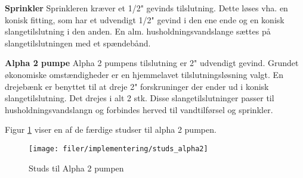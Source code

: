 
\textbf{Sprinkler} \newline
Sprinkleren kræver et 1/2" gevinds tilslutning. Dette løses vha. en konisk fitting, som har et udvendigt 1/2" gevind i den ene ende og en konisk slangetilslutning i den anden. En alm. husholdningsvandslange sættes på slangetilslutningen med et spændebånd. 

\textbf{Alpha 2 pumpe}  \newline
Alpha 2 pumpens tilslutning er 2" udvendigt gevind. Grundet økonomiske omstændigheder er en hjemmelavet tilslutningsløsning valgt. En drejebænk er benyttet til at dreje 2" forskruninger der ender ud i konisk slangetilslutning. Det drejes i alt 2 stk. Disse slangetilslutninger passer til husholdningsvandslangn og forbindes herved til vandtilførsel og sprinkler.

Figur \ref{lab:fitting_alpha2} viser en af de færdige studser til alpha 2 pumpen. 

\begin{figure}[htb]
\centering
{\texttt{[image: filer/implementering/studs\_alpha2]}}
\caption{Studs til Alpha 2 pumpen}
\label{lab:fitting_alpha2}
\end{figure}

